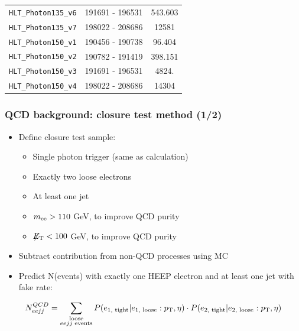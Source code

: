 \documentclass[bigger]{beamer}
\begin{document}
\begin{frame}
{\begin{tabular}{|l|c|c|}
{\tt HLT\_Photon135\_v6}               & 191691 - 196531 & 543.603  \\
{\tt HLT\_Photon135\_v7}               & 198022 - 208686 & 12581    \\
\hline
{\tt HLT\_Photon150\_v1}               & 190456 - 190738 & 96.404   \\
{\tt HLT\_Photon150\_v2}               & 190782 - 191419 & 398.151  \\
{\tt HLT\_Photon150\_v3}               & 191691 - 196531 & 4824.    \\
{\tt HLT\_Photon150\_v4}               & 198022 - 208686 & 14304    \\
\hline
\hline
\end{tabular}
}
\end{frame}
\begin{frame}
\frametitle{QCD background: closure test method (1/2)}
\label{sec-1-4-2}
\label{sec-1-4-2-1}

\small
\begin{itemize}
\item Define closure test sample:
\begin{itemize}
\small
\item Single photon trigger (same as calculation)
\item Exactly two loose electrons
\item At least one jet
\item $m_{\text{ee}} > 110$ GeV, to improve QCD purity
\item $\not\!\!{E_{\text{T}}} < 100$ GeV, to improve QCD purity
\end{itemize}
\item Subtract contribution from non-QCD processes using MC
\item Predict N(events) with exactly one HEEP electron and at least one jet with fake rate:
\end{itemize}
\begin{align*}
N_{eejj}^{QCD}  &= \sum_{\substack{\text{loose} \\eejj \text{ events}}} P(e_{\text{1, tight}} | e_{\text{1, loose}}:p_{\text{T}}, \eta) \cdot P(e_{\text{2, tight}} | e_{\text{2, loose}}:p_{\text{T}}, \eta) \\
\end{align*}
\end{frame}
\end{document}
